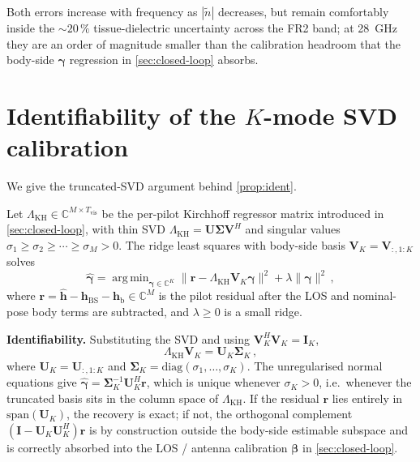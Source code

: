 \documentclass[journal,twocolumn,10pt]{IEEEtran}
\theoremstyle{plain}
\theoremstyle{definition}
\theoremstyle{remark}
\newcommand{\hh}{\bm{h}}
\newcommand{\betab}{\bm{\beta}}
\newcommand{\gammab}{\bm{\gamma}}
\newcommand{\hBS}{\bm{h}_{\mathrm{BS}}}
\newcommand{\hbody}{\bm{h}_{\mathrm{b}}}
\newcommand{\Complex}{\mathbb{C}}
\newcommand{\ntilde}{\tilde{n}}
\DeclareMathOperator*{\argmin}{arg\,min}
\begin{document}
Both errors increase with frequency as $|\ntilde|$ decreases, but
remain comfortably inside the $\sim\!20\,\%$ tissue-dielectric
uncertainty across the FR2 band; at 28~GHz they are an order of
magnitude smaller than the calibration headroom that the body-side
$\gammab$ regression in \cref{sec:closed-loop} absorbs.

\section{Identifiability of the $K$-mode SVD calibration}
\label{app:ident}

We give the truncated-SVD argument behind \cref{prop:ident}.

Let $\Lambda_{\mathrm{KH}} \in \Complex^{M \times T_{\mathrm{vis}}}$
be the per-pilot Kirchhoff regressor matrix introduced in
\cref{sec:closed-loop}, with thin SVD
$\Lambda_{\mathrm{KH}} = \bm{U}\bm{\Sigma}\bm{V}^{\!H}$ and singular
values $\sigma_1 \geq \sigma_2 \geq \cdots \geq \sigma_M > 0$. The
ridge least squares with body-side basis
$\bm{V}_K = \bm{V}_{:,1:K}$ solves
\begin{equation}\label{eq:gamma-ridge}
  \hat{\gammab} = \argmin_{\gammab \in \Complex^K}
    \bigl\|\bm{r} - \Lambda_{\mathrm{KH}}\bm{V}_K\gammab\bigr\|^2
  + \lambda \|\gammab\|^2\,,
\end{equation}
where $\bm{r} = \hat{\hh} - \hBS - \hbody \in \Complex^M$ is the
pilot residual after the LOS and nominal-pose body terms are
subtracted, and $\lambda \geq 0$ is a small ridge.

\textbf{Identifiability.} Substituting the SVD and using
$\bm{V}_K^{\!H}\bm{V}_K = \bm{I}_K$,
\begin{equation}\label{eq:Fb-Vk}
  \Lambda_{\mathrm{KH}}\bm{V}_K = \bm{U}_K\bm{\Sigma}_K\,,
\end{equation}
where $\bm{U}_K = \bm{U}_{:,1:K}$ and
$\bm{\Sigma}_K = \mathrm{diag}(\sigma_1,\dots,\sigma_K)$. The
unregularised normal equations give
$\hat{\gammab} = \bm{\Sigma}_K^{-1}\bm{U}_K^{\!H}\bm{r}$, which is
unique whenever $\sigma_K > 0$, i.e.~whenever the truncated basis
sits in the column space of $\Lambda_{\mathrm{KH}}$. If the residual
$\bm{r}$ lies entirely in $\mathrm{span}(\bm{U}_K)$, the recovery is
exact; if not, the orthogonal complement
$(\bm{I}-\bm{U}_K\bm{U}_K^{\!H})\bm{r}$ is by construction outside
the body-side estimable subspace and is correctly absorbed into the
LOS / antenna calibration $\betab$ in
\cref{sec:closed-loop}.
\end{document}
